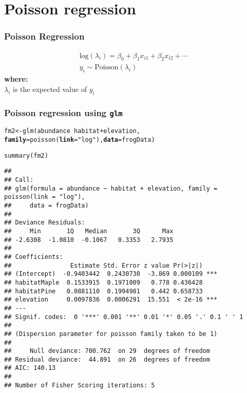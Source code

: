\documentclass[color=usenames,dvipsnames]{beamer}\usepackage[]{graphicx}\usepackage[]{color}
\makeatletter
\newcommand{\hlstr}[1]{\textcolor[rgb]{0.749,0.012,0.012}{#1}}%
\newcommand{\hlopt}[1]{\textcolor[rgb]{0,0,0}{#1}}%
\newcommand{\hlstd}[1]{\textcolor[rgb]{0,0,0}{#1}}%
\newcommand{\hlkwb}[1]{\textcolor[rgb]{0,0.341,0.682}{#1}}%
\newcommand{\hlkwc}[1]{\textcolor[rgb]{0,0,0}{\textbf{#1}}}%
\newcommand{\hlkwd}[1]{\textcolor[rgb]{0.004,0.004,0.506}{#1}}%
\newenvironment{kframe}{%
 \def\at@end@of@kframe{}%
 \ifinner\ifhmode%
  \def\at@end@of@kframe{\end{minipage}}%
  \begin{minipage}{\columnwidth}%
 \fi\fi%
 \def\FrameCommand##1{\hskip\@totalleftmargin \hskip-\fboxsep
 \colorbox{shadecolor}{##1}\hskip-\fboxsep
     \hskip-\linewidth \hskip-\@totalleftmargin \hskip\columnwidth}%
 \MakeFramed {\advance\hsize-\width
   \@totalleftmargin\z@ \linewidth\hsize
   \@setminipage}}%
 {\par\unskip\endMakeFramed%
 \at@end@of@kframe}
\newenvironment{knitrout}{}{} %
\makeatother
\begin{document}
\section{Poisson regression}



\begin{frame}
  \frametitle{Poisson Regression}
    \begin{gather*}
      \mathrm{log}(\lambda_i) = \beta_0 + \beta_1 x_{i1} + \beta_2 x_{i2} + \cdots \\
      y_i \sim \mathrm{Poisson}(\lambda_i)
  \end{gather*}
  \pause
  {\bf where: \\}
  $\lambda_i$ is the expected value of $y_i$
\end{frame}







\begin{frame}[fragile]
  \frametitle{Poisson regression using {\tt glm}}
\begin{knitrout}\tiny
{}\color{fgcolor}\begin{kframe}
\begin{alltt}
\hlstd{fm2} \hlkwb{<-} \hlkwd{glm}\hlstd{(abundance} \hlopt{~} \hlstd{habitat} \hlopt{+} \hlstd{elevation,}
           \hlkwc{family}\hlstd{=}\hlkwd{poisson}\hlstd{(}\hlkwc{link}\hlstd{=}\hlstr{"log"}\hlstd{),} \hlkwc{data}\hlstd{=frogData)}
\end{alltt}
\end{kframe}
\end{knitrout}
\pause
\begin{knitrout}\tiny
{}\color{fgcolor}\begin{kframe}
\begin{alltt}
\hlkwd{summary}\hlstd{(fm2)}
\end{alltt}
\begin{verbatim}
## 
## Call:
## glm(formula = abundance ~ habitat + elevation, family = poisson(link = "log"), 
##     data = frogData)
## 
## Deviance Residuals: 
##     Min       1Q   Median       3Q      Max  
## -2.6308  -1.0810  -0.1067   0.3353   2.7935  
## 
## Coefficients:
##                Estimate Std. Error z value Pr(>|z|)    
## (Intercept)  -0.9403442  0.2430730  -3.869 0.000109 ***
## habitatMaple  0.1533915  0.1971009   0.778 0.436428    
## habitatPine   0.0881110  0.1994981   0.442 0.658733    
## elevation     0.0097836  0.0006291  15.551  < 2e-16 ***
## ---
## Signif. codes:  0 '***' 0.001 '**' 0.01 '*' 0.05 '.' 0.1 ' ' 1
## 
## (Dispersion parameter for poisson family taken to be 1)
## 
##     Null deviance: 700.762  on 29  degrees of freedom
## Residual deviance:  44.891  on 26  degrees of freedom
## AIC: 140.13
## 
## Number of Fisher Scoring iterations: 5
\end{verbatim}
\end{kframe}
\end{knitrout}
\end{frame}
\end{document}
